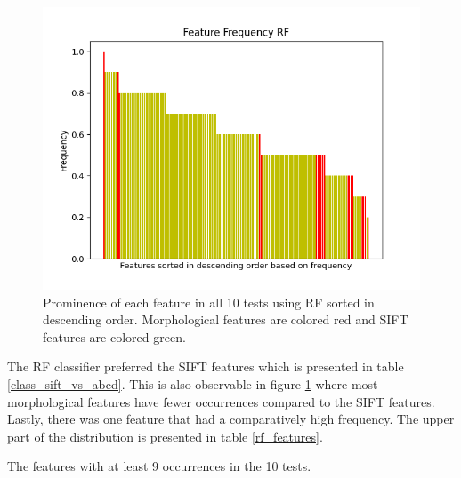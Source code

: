 \documentclass{kththesis}
\begin{document}
\begin{figure}[h!]
  \centering
  \includegraphics[scale=0.8]{figures/rf_all_freqs.png}
  \caption{Prominence of each feature in all 10 tests using RF sorted in descending order. Morphological features are colored red and SIFT features are colored green.}
  \label{fig:freqs_rf}
\end{figure}

The RF classifier preferred the SIFT features which is presented in table \ref{class_sift_vs_abcd}. This is also observable in figure \ref{fig:freqs_rf} where most morphological features have fewer occurrences compared to the SIFT features. Lastly, there was one feature that had a comparatively high frequency. The upper part of the distribution is presented in table \ref{rf_features}.

\newpage

\begin{table}[h!]
  \caption{The features with at least 9 occurrences in the 10 tests.}
  \begin{center}
  \end{center}
  \label{rf_features}
\end{table}
\end{document}
